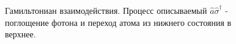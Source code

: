 \begin{figure}
\centering



\caption{Гамильтониан взаимодействия. Процесс описываемый $\hat{a}\hat{\sigma}^{\dag}$ - поглощение
  фотона и переход атома из нижнего состояния в верхнее.}
\label{figPart1Ch2_2_2}
\end{figure}
